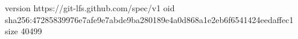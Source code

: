 version https://git-lfs.github.com/spec/v1
oid sha256:47285839976e7afe9e7abde9ba280189e4a0d868a1e2eb6f6541424eedaffec1
size 40499
